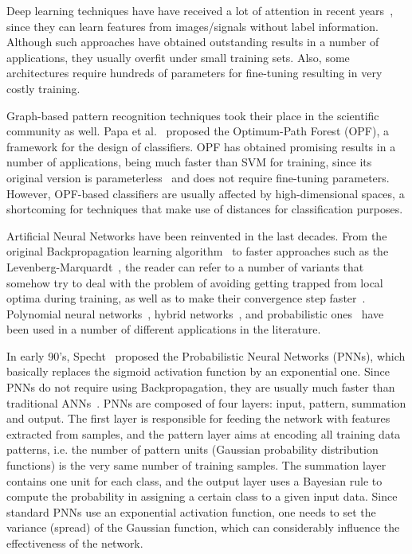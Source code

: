 Deep learning techniques have have received a lot of attention in recent years~\cite{LeCunNature:15,RafieiCEM:16}, since they can learn features from images/signals without label information. Although such approaches have obtained outstanding results in a number of applications, they usually overfit under small training sets. Also, some architectures require hundreds of parameters for fine-tuning resulting in very costly training.

Graph-based pattern recognition techniques took their place in the scientific community as well. Papa et al.~\cite{PapaISVC:08,PapaIJIST:09,PapaPR:12,PapaPRL:17} proposed the Optimum-Path Forest (OPF), a framework for the design of classifiers. OPF has obtained promising results in a number of applications, being much faster than SVM for training, since its original version is parameterless~\cite{PapaIJIST:09,PapaPR:12} and does not require fine-tuning parameters. However, OPF-based classifiers are usually affected by high-dimensional spaces, a shortcoming for techniques that make use of distances for classification purposes.

Artificial Neural Networks have been reinvented in the last decades. From the original Backpropagation learning algorithm~\cite{RumelhartNature:86} to faster approaches such as the Levenberg-Marquardt~\cite{HaganIEEETNN:94}, the reader can refer to a number of variants that somehow try to deal with the problem of avoiding getting trapped from local optima during training, as well as to make their convergence step faster~\cite{LiuIEEETSMC:11}. Polynomial neural networks~\cite{Lin:15}, hybrid networks~\cite{Martinel:15}, and probabilistic ones~\cite{Specht:90,AhmadlouICAE:10} have been used in a number of different applications in the literature.



In early 90's, Specht~\cite{Specht:90} proposed the Probabilistic Neural Networks (PNNs), which basically replaces the sigmoid activation function by an exponential one. Since PNNs do not require using Backpropagation, they are usually much faster than traditional ANNs~\cite{AdeliNN:09,SankariJNM:11}. PNNs are composed of four layers: input, pattern, summation and output. The first layer is responsible for feeding the network with features extracted from samples, and the pattern layer aims at encoding all training data patterns, i.e. the number of pattern units (Gaussian probability distribution functions) is the very same number of training samples. The summation layer contains one unit for each class, and the output layer uses a Bayesian rule to compute the probability in assigning a certain class to a given input data. Since standard PNNs use an exponential activation function, one needs to set the variance (spread) of the Gaussian function, which can considerably influence the effectiveness of the network. 

